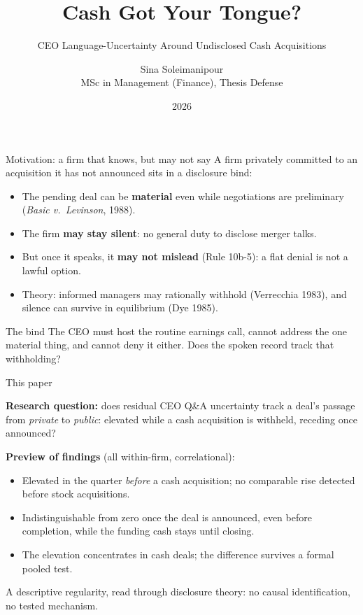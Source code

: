 \documentclass[aspectratio=169, 11pt]{beamer}
\title{Cash Got Your Tongue?}
\subtitle{CEO Language-Uncertainty Around Undisclosed Cash Acquisitions}
\author{Sina Soleimanipour \\ MSc in Management (Finance), Thesis Defense}
\institute{Telfer School of Management, University of Ottawa \\[6pt]
  {\small Supervisors: Dr.\ Ali Akyol, Dr.\ Harshit Rajaiya \\
  Examiners: Dr.\ Shantanu Dutta, Dr.\ Rengong (Alex) Zhang}}
\date{2026}
\begin{document}
\begin{frame}[plain]
  \titlepage
\end{frame}

\begin{frame}{Motivation: a firm that knows, but may not say}
  A firm privately committed to an acquisition it has not announced sits in a
  \alert{disclosure bind}:
  \begin{itemize}
    \item The pending deal can be \textbf{material} even while negotiations are
      preliminary (\textit{Basic v.\ Levinson}, 1988).
    \item The firm \textbf{may stay silent}: no general duty to disclose merger talks.
    \item But once it speaks, it \textbf{may not mislead} (Rule 10b-5): a flat
      denial is not a lawful option.
    \item Theory: informed managers may rationally withhold (Verrecchia 1983),
      and silence can survive in equilibrium (Dye 1985).
  \end{itemize}
  \vspace{0.5em}
  \begin{block}{The bind}
    The CEO must host the routine earnings call, cannot address the one material
    thing, and cannot deny it either. Does the spoken record track that withholding?
  \end{block}
\end{frame}

\begin{frame}{This paper}
  \begin{center}
    \textbf{Research question:} does residual CEO Q\&A uncertainty track a deal's
    passage from \emph{private} to \emph{public}: elevated while a cash acquisition
    is withheld, receding once announced?
  \end{center}
  \vspace{0.3em}
  \textbf{Preview of findings} (all within-firm, correlational):
  \begin{itemize}
    \item Elevated in the quarter \emph{before} a cash acquisition; no comparable
      rise detected before stock acquisitions.
    \item Indistinguishable from zero once the deal is announced, even before
      completion, while the funding cash stays until closing.
    \item The elevation concentrates in cash deals; the difference survives a
      formal pooled test.
  \end{itemize}
  \vspace{0.2em}
  {\scriptsize\color{mutedgray} A descriptive regularity, read through disclosure
  theory: no causal identification, no tested mechanism.}
\end{frame}
\end{document}

